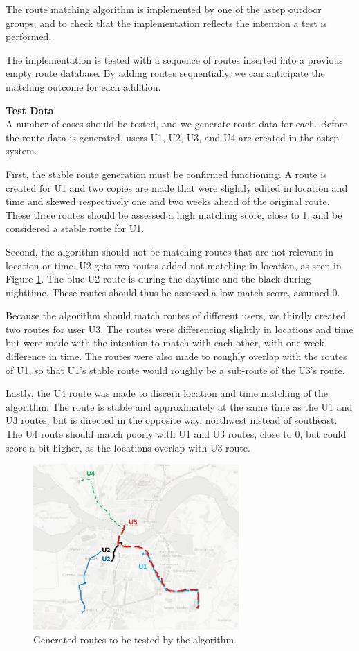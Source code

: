 The route matching algorithm is implemented by one of the \gls{astep} outdoor groups, and to check that the implementation reflects the intention a test is performed.

The implementation is tested with a sequence of routes inserted into a previous empty route database.
By adding routes sequentially, we can anticipate the matching outcome for each addition.


\textbf{Test Data}\\
A number of cases should be tested, and we generate route data for each. 
Before the route data is generated, users U1, U2, U3, and U4 are created in the \gls{astep} system.

First, the stable route generation must be confirmed functioning.
A route is created for U1 and two copies are made that were slightly edited in location and time and skewed respectively one and two weeks ahead of the original route.
These three routes should be assessed a high matching score, close to 1, and be considered a stable route for U1.

Second, the algorithm should not be matching routes that are not relevant in location or time.
U2 gets two routes added not matching in location, as seen in Figure \ref{fig:algroutes}.
The blue U2 route is during the daytime and the black during nighttime.
These routes should thus be assessed a low match score, assumed 0.

Because the algorithm should match routes of different users, we thirdly created two routes for user U3.
The routes were differencing slightly in locations and time but were made with the intention to match with each other, with one week difference in time.
The routes were also made to roughly overlap with the routes of U1, so that U1's stable route would roughly be a sub-route of the U3's route.

Lastly, the U4 route was made to discern location and time matching of the algorithm.
The route is stable and approximately at the same time as the U1 and U3 routes, but is directed in the opposite way, northwest instead of southeast.
The U4 route should match poorly with U1 and U3 routes, close to 0, but could score a bit higher, as the locations overlap with U3 route.

\begin{figure}[h]
	\centering
	\includegraphics[width=0.7\textwidth]{figures/algorithmroutes.png}
	\caption{Generated routes to be tested by the algorithm.}
	\label{fig:algroutes}
\end{figure}


